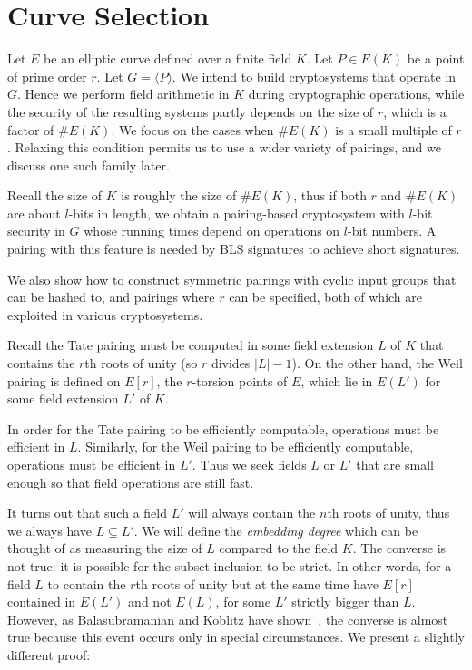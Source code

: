 \chapter{Curve Selection}

Let $E$ be an elliptic curve defined over a finite field $K$.
Let $P \in E(K)$ be a point of prime order $r$. Let $G = \langle P \rangle$.
We intend to build cryptosystems that operate in $G$. Hence
we perform field arithmetic in $K$ during cryptographic operations,
while the security of the resulting systems partly depends on the size of $r$,
which is a factor of $\#E(K)$.
We focus on the cases when $\#E(K)$ is a small multiple of $r$.
Relaxing this condition permits us to use a wider variety of pairings, and we
discuss one such family later.

Recall the size of $K$ is roughly the size of $\#E(K)$,
thus if both $r$ and $\#E(K)$ are about $l$-bits in length,
we obtain a pairing-based cryptosystem with $l$-bit security
in $G$ whose running times depend on operations on $l$-bit numbers.
A pairing with this feature is needed by BLS signatures to
achieve short signatures.

We also show how to construct symmetric pairings with cyclic input groups that
can be hashed to, and pairings where $r$ can be specified, both of which are
exploited in various cryptosystems.

Recall the Tate pairing must be computed in some field extension $L$ of $K$
that contains the $r$th roots of unity (so $r$ divides $|L| - 1$). On the other
hand, the Weil pairing is defined on $E[r]$, the $r$-torsion points of $E$,
which lie in $E(L')$ for some field extension $L'$ of $K$.

In order for the Tate pairing to be efficiently computable, operations must be
efficient in $L$. Similarly, for the Weil pairing to be efficiently computable,
operations must be efficient in $L'$. Thus we seek fields $L$ or $L'$ that are
small enough so that field operations are still fast.

It turns out that such a field $L'$ will always contain the $n$th
roots of unity, thus we always have $L \subseteq L'$.
We will define the \emph{embedding degree} which can be thought of as measuring
the size of $L$ compared to the field $K$.
The converse is not true: it is possible for the subset inclusion to be strict.
In other words, for a field $L$ to contain the $r$th roots of unity but
at the same time have $E[r]$ contained in $E(L')$ and not $E(L)$, for
some $L'$ strictly bigger than $L$.
However, as Balasubramanian and Koblitz have shown~\cite{bk},
the converse is almost true because this event occurs only in
special circumstances. We present a slightly different proof:

